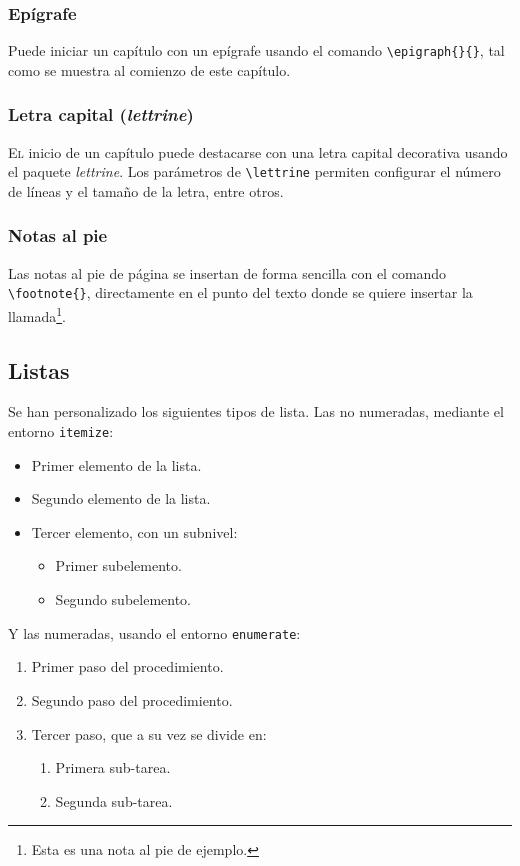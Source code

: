 \subsubsection*{Epígrafe}

Puede iniciar un capítulo con un epígrafe usando el comando \lstinline|\epigraph{}{}|, tal como se muestra al comienzo de este capítulo.

\subsubsection*{Letra capital (\textit{lettrine})}

\lettrine[lraise=-0.1, lines=2, loversize=0.2]{E}{l} inicio de un capítulo puede destacarse con una letra capital decorativa usando el paquete \textit{lettrine}. Los parámetros de \lstinline{\lettrine} permiten configurar el número de líneas y el tamaño de la letra, entre otros.

\subsubsection*{Notas al pie}

Las notas al pie de página se insertan de forma sencilla con el comando \lstinline|\footnote{}|, directamente en el punto del texto donde se quiere insertar la llamada\footnote{Esta es una nota al pie de ejemplo.}.

\subsection{Listas}

Se han personalizado los siguientes tipos de lista. Las no numeradas, mediante el entorno \lstinline{itemize}:
\begin{itemize}\itemsep 0em
    \item Primer elemento de la lista.
    \item Segundo elemento de la lista.
    \item Tercer elemento, con un subnivel:
    \begin{itemize}
        \item Primer subelemento.
        \item Segundo subelemento.
    \end{itemize}
\end{itemize}

Y las numeradas, usando el entorno \lstinline{enumerate}:
\begin{enumerate}\itemsep 0em
    \item Primer paso del procedimiento.
    \item Segundo paso del procedimiento.
    \item Tercer paso, que a su vez se divide en:
    \begin{enumerate}
        \item Primera sub-tarea.
        \item Segunda sub-tarea.
    \end{enumerate}
\end{enumerate}

